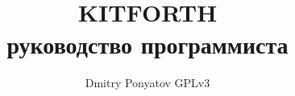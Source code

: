 

\author{Dmitry Ponyatov  GPLv3}
\title{{\Huge\ }\\KITFORTH\\руководство программиста}




\maketitle
\tableofcontents\secdown






